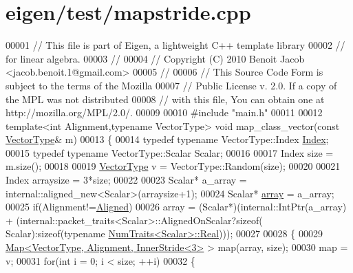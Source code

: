 \hypertarget{eigen_2test_2mapstride_8cpp_source}{}\section{eigen/test/mapstride.cpp}
\label{eigen_2test_2mapstride_8cpp_source}

\begin{DoxyCode}
00001 \textcolor{comment}{// This file is part of Eigen, a lightweight C++ template library}
00002 \textcolor{comment}{// for linear algebra.}
00003 \textcolor{comment}{//}
00004 \textcolor{comment}{// Copyright (C) 2010 Benoit Jacob <jacob.benoit.1@gmail.com>}
00005 \textcolor{comment}{//}
00006 \textcolor{comment}{// This Source Code Form is subject to the terms of the Mozilla}
00007 \textcolor{comment}{// Public License v. 2.0. If a copy of the MPL was not distributed}
00008 \textcolor{comment}{// with this file, You can obtain one at http://mozilla.org/MPL/2.0/.}
00009 
00010 \textcolor{preprocessor}{#include "main.h"}
00011 
00012 \textcolor{keyword}{template}<\textcolor{keywordtype}{int} Alignment,\textcolor{keyword}{typename} VectorType> \textcolor{keywordtype}{void} map\_class\_vector(\textcolor{keyword}{const} 
      \hyperlink{struct_vector_type}{VectorType}& m)
00013 \{
00014   \textcolor{keyword}{typedef} \textcolor{keyword}{typename} VectorType::Index \hyperlink{namespace_eigen_a62e77e0933482dafde8fe197d9a2cfde}{Index};
00015   \textcolor{keyword}{typedef} \textcolor{keyword}{typename} VectorType::Scalar Scalar;
00016 
00017   Index size = m.size();
00018 
00019   \hyperlink{struct_vector_type}{VectorType} v = VectorType::Random(size);
00020 
00021   Index arraysize = 3*size;
00022   
00023   Scalar* a\_array = internal::aligned\_new<Scalar>(arraysize+1);
00024   Scalar* \hyperlink{class_eigen_1_1array}{array} = a\_array;
00025   \textcolor{keywordflow}{if}(Alignment!=\hyperlink{group__enums_gga45fe06e29902b7a2773de05ba27b47a1ad37d4c71425bb286e9b4103830538fbf}{Aligned})
00026     array = (Scalar*)(internal::IntPtr(a\_array) + (internal::packet\_traits<Scalar>::AlignedOnScalar?\textcolor{keyword}{sizeof}(
      Scalar):\textcolor{keyword}{sizeof}(\textcolor{keyword}{typename} \hyperlink{group___core___module_struct_eigen_1_1_num_traits}{NumTraits<Scalar>::Real})));
00027 
00028   \{
00029     \hyperlink{group___core___module_class_eigen_1_1_map}{Map<VectorType, Alignment, InnerStride<3>} > map(array, size);
00030     map = v;
00031     \textcolor{keywordflow}{for}(\textcolor{keywordtype}{int} i = 0; i < size; ++i)
00032     \{

\end{DoxyCode}
